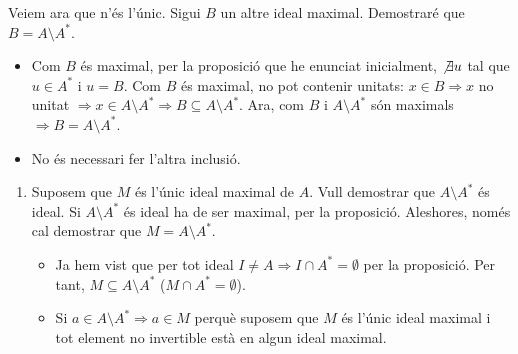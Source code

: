 \documentclass[../main.tex]{subfiles}
\begin{document}
\begin{sol}
\begin{enumerate}[(a)]
\begin{enumerate}[($\Rightarrow$)]
        Veiem ara que n'és l'únic. Sigui $B$ un altre ideal maximal. Demostraré que $B = A\setminus A^*$.
        \begin{itemize}
            \item \fbox{$\subseteq$} Com $B$ és maximal, per la proposició que he enunciat inicialment, $\not\exists u$ tal que $u\in A^*$ i $u=B$. Com $B$ és maximal, no pot contenir unitats: $x\in B\Rightarrow x$ no unitat $\Rightarrow x\in A\setminus A^*\Rightarrow B\subseteq A\setminus A^*$. Ara, com $B$ i $A\setminus A^*$ són maximals $\Longrightarrow B = A\setminus A^*$. 
            \item No és necessari fer l'altra inclusió.
        \end{itemize}
    \end{enumerate}
    \begin{enumerate}[($\Leftarrow$)]
        \item Suposem que $M$ és l'únic ideal maximal de $A$. Vull demostrar que $A\setminus A^*$ és ideal. Si $A\setminus A^*$ és ideal ha de ser maximal, per la proposició. Aleshores, només cal demostrar que $M = A\setminus A^*$.
        \begin{itemize}
            \item \fbox{$\subseteq$} Ja hem vist que per tot ideal $I\not=A\Rightarrow I\cap A^* = \emptyset$ per la proposició. Per tant, $M\subseteq A\setminus A^*$ ($M\cap A^*=\emptyset$).
            \item \fbox{$\supseteq$} Si $a\in A\setminus A^*\Rightarrow a\in M$ perquè suposem que $M$ és l'únic ideal maximal i tot element no invertible està en algun ideal maximal.
        \end{itemize}
    \end{enumerate}
    
    
    
    
    
    
    
    
    
    
    

\end{enumerate}
\end{sol}
\end{document}

